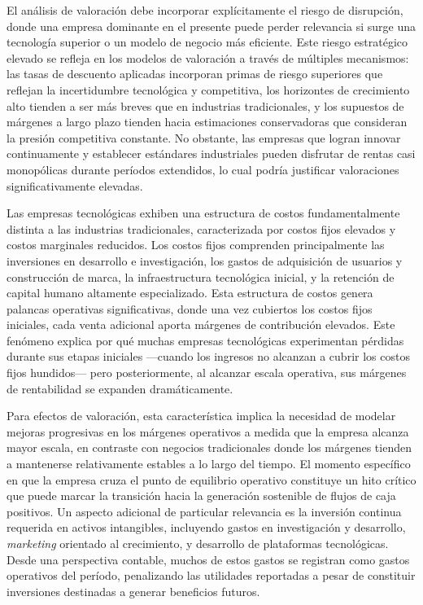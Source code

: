 El análisis de valoración debe incorporar explícitamente el riesgo de disrupción, donde una empresa dominante en el presente puede perder relevancia si surge una tecnología superior o un modelo de negocio más eficiente. Este riesgo estratégico elevado se refleja en los modelos de valoración a través de múltiples mecanismos: las tasas de descuento aplicadas incorporan primas de riesgo superiores que reflejan la incertidumbre tecnológica y competitiva, los horizontes de crecimiento alto tienden a ser más breves que en industrias tradicionales, y los supuestos de márgenes a largo plazo tienden hacia estimaciones conservadoras que consideran la presión competitiva constante. No obstante, las empresas que logran innovar continuamente y establecer estándares industriales pueden disfrutar de rentas casi monopólicas durante períodos extendidos, lo cual podría justificar valoraciones significativamente elevadas.

Las empresas tecnológicas exhiben una estructura de costos fundamentalmente distinta a las industrias tradicionales, caracterizada por costos fijos elevados y costos marginales reducidos. Los costos fijos comprenden principalmente las inversiones en desarrollo e investigación, los gastos de adquisición de usuarios y construcción de marca, la infraestructura tecnológica inicial, y la retención de capital humano altamente especializado. Esta estructura de costos genera palancas operativas significativas, donde una vez cubiertos los costos fijos iniciales, cada venta adicional aporta márgenes de contribución elevados. Este fenómeno explica por qué muchas empresas tecnológicas experimentan pérdidas durante sus etapas iniciales ---cuando los ingresos no alcanzan a cubrir los costos fijos hundidos--- pero posteriormente, al alcanzar escala operativa, sus márgenes de rentabilidad se expanden dramáticamente.

Para efectos de valoración, esta característica implica la necesidad de modelar mejoras progresivas en los márgenes operativos a medida que la empresa alcanza mayor escala, en contraste con negocios tradicionales donde los márgenes tienden a mantenerse relativamente estables a lo largo del tiempo. El momento específico en que la empresa cruza el punto de equilibrio operativo constituye un hito crítico que puede marcar la transición hacia la generación sostenible de flujos de caja positivos. Un aspecto adicional de particular relevancia es la inversión continua requerida en activos intangibles, incluyendo gastos en investigación y desarrollo, \emph{marketing} orientado al crecimiento, y desarrollo de plataformas tecnológicas. Desde una perspectiva contable, muchos de estos gastos se registran como gastos operativos del período, penalizando las utilidades reportadas a pesar de constituir inversiones destinadas a generar beneficios futuros.


